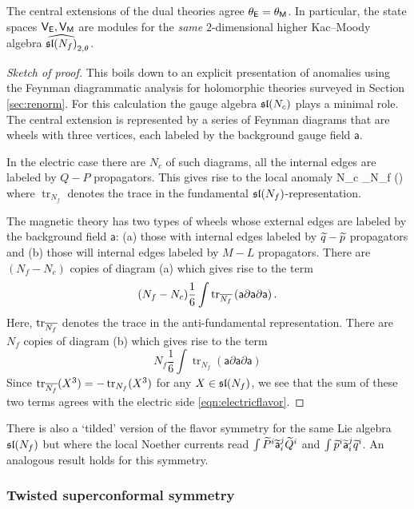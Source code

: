 \documentclass[11pt]{amsart}
\def\sfa{\mathsf{a}}
\renewcommand{\op}{\operatorname}
\begin{document}
\begin{prop}
The central extensions of the dual theories agree $\theta_\sfE = \theta_\sfM$. 
In particular, the state spaces $\sfV_\sfE, \sfV_\sfM$ are modules for the {\em same} $2$-dimensional higher Kac--Moody algebra $\Hat{\sl(N_f)}_{2,\theta}$.
\end{prop}

\begin{proof}[Sketch of proof]
This boils down to an explicit presentation of anomalies using the Feynman diagrammatic analysis for holomorphic theories surveyed in Section \ref{sec:renorm}. 
For this calculation the gauge algebra $\sl(N_c)$ plays a minimal role. 
The central extension is represented by a series of Feynman diagrams that are wheels with three vertices, each labeled by the background gauge field $\sfa$.

In the electric case there are $N_c$ of such diagrams, all the internal edges are labeled by $Q-P$ propagators. 
This gives rise to the local anomaly
\beqn\label{eqn:electricflavor}
N_c  \int \op{tr}_{N_f} \left(\sfa \partial \sfa \partial \sfa\right) 
\eeqn
where $\op{tr}_{N_f}$ denotes the trace in the fundamental $\sl(N_f)$-representation.

The magnetic theory has two types of wheels whose external edges are labeled by the background field $\sfa$: (a) those with 
internal edges labeled by $\Tilde{q}-\Tilde{p}$ propagators and (b) those will internal edges labeled by $M-L$ propagators. 
There are $(N_f - N_c)$ copies of diagram (a) which gives rise to the term
\[
(N_f - N_c) \frac16 \int \op{tr}_{\Bar{N_f}} \left(\sfa \partial \sfa \partial \sfa\right) .
\]
Here, $\op{tr}_{\Bar{N_f}}$ denotes the trace in the anti-fundamental representation. 
There are $N_f$ copies of diagram (b) which gives rise to the term
\[
N_f \frac16\int \op{tr}_{N_f} \left(\sfa \partial \sfa \partial \sfa\right) 
\]
Since $\op{tr}_{\Bar{N_f}} (X^3) = - \op{tr}_{N_f} (X^3)$ for any $X \in \sl(N_f)$, we see that the sum of these two terms agrees with the electric side \eqref{eqn:electricflavor}.
\end{proof}

There is also a `tilded' version of the flavor symmetry for the same Lie algebra $\sl(N_f)$ but where the local Noether currents read $\int \Tilde{P}^i \Tilde{\sfa}_i^j \Tilde{Q}^i$ and $\int \Tilde{p}^i \Tilde{\sfa}_i^j \Tilde{q}^i$.
An analogous result holds for this symmetry.

\subsubsection{Twisted superconformal symmetry}
\end{document}
